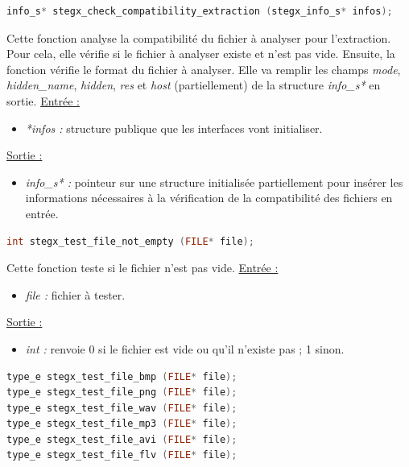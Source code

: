 \documentclass[11pt]{article}
\begin{document}
\begin{lstlisting}[language=c]
info_s* stegx_check_compatibility_extraction (stegx_info_s* infos);
\end{lstlisting}

Cette fonction analyse la compatibilité du fichier à analyser pour l'extraction. 
Pour cela, elle vérifie si le fichier à analyser existe et n'est pas vide. 
Ensuite, la fonction vérifie le format du fichier à analyser. 
Elle va remplir les champs \textit{mode}, \textit{hidden\_name}, \textit{hidden},
\textit{res} et \textit{host} (partiellement) de la structure
\textit{info\_s*} en sortie. 
\newline
\underline{Entrée :}
\begin{itemize}
\item \textit{*infos :} structure publique que les interfaces vont initialiser.
\end{itemize}
\underline{Sortie :}
\begin{itemize}
\item \textit{info\_s* :} pointeur sur une structure initialisée 
partiellement pour insérer les informations nécessaires à la vérification 
de la compatibilité des fichiers en entrée. 
\newline 
\end{itemize}

\begin{lstlisting}[language=c]
int stegx_test_file_not_empty (FILE* file);
\end{lstlisting}

Cette fonction teste si le fichier n'est pas vide. 
\newline
\underline{Entrée :}
\begin{itemize}
\item \textit{file :} fichier à tester.
\end{itemize}
\underline{Sortie :} 
\begin{itemize}
\item \textit{int :} renvoie 0 si le fichier est vide ou qu'il n'existe pas ; 1 sinon. 
\newline \end{itemize}

\begin{lstlisting}[language=c]
type_e stegx_test_file_bmp (FILE* file);
type_e stegx_test_file_png (FILE* file);
type_e stegx_test_file_wav (FILE* file);
type_e stegx_test_file_mp3 (FILE* file);
type_e stegx_test_file_avi (FILE* file);
type_e stegx_test_file_flv (FILE* file);
\end{lstlisting}
\end{document}
